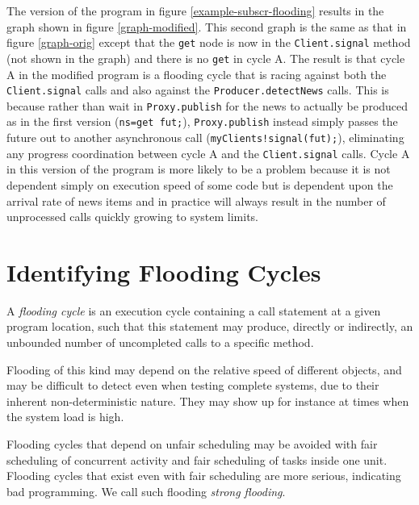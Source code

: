 \documentclass[12pt]{article}%
\begin{document}
The version of the program in figure \ref{example-subscr-flooding}
results in the graph shown in figure \ref{graph-modified}. This second graph is the same as that in figure \ref{graph-orig}
except that the \lstinline{get} node is now in the  \lstinline{Client.signal}
method (not shown in the graph) and there is no \lstinline{get} in cycle A. 
The result is that cycle A in the modified program
is a flooding cycle that is racing against both the
\lstinline{Client.signal} calls and also against the
\lstinline{Producer.detectNews} calls.  This is because rather than
wait in \lstinline{Proxy.publish} for the news to actually be produced
as in the first version (\lstinline{ns=get fut;}),
\lstinline{Proxy.publish} instead simply passes the future out to
another asynchronous call (\lstinline{myClients!signal(fut);}),
eliminating any progress coordination between cycle A and the
\lstinline{Client.signal} calls. Cycle A in this version of the program is more likely to be a
problem because it is not dependent simply on execution speed of some
code but is dependent upon the arrival rate of news items and in
practice will always result in the number of unprocessed calls quickly
growing to system limits.

\section{Identifying Flooding Cycles}

\begin{definition}\label{flooding-cycle}
A \emph{flooding cycle} is an execution cycle 
containing a call statement
 at a given program location, such that 
this statement may produce, directly or indirectly, an unbounded number of 
uncompleted
calls to a specific method.
\end{definition}%

Flooding of this kind may depend on the relative
speed of different objects, and  may be difficult to detect even
when testing complete systems, due to their inherent
non-deterministic nature.  They may show up for instance at times when
the system load is high.

Flooding cycles that depend on unfair scheduling
may be avoided with fair scheduling of concurrent activity and
fair scheduling of  tasks inside one unit.
Flooding cycles that exist even with fair scheduling
are more serious, indicating bad programming.
We call such flooding \emph{strong flooding}.
\end{document}
